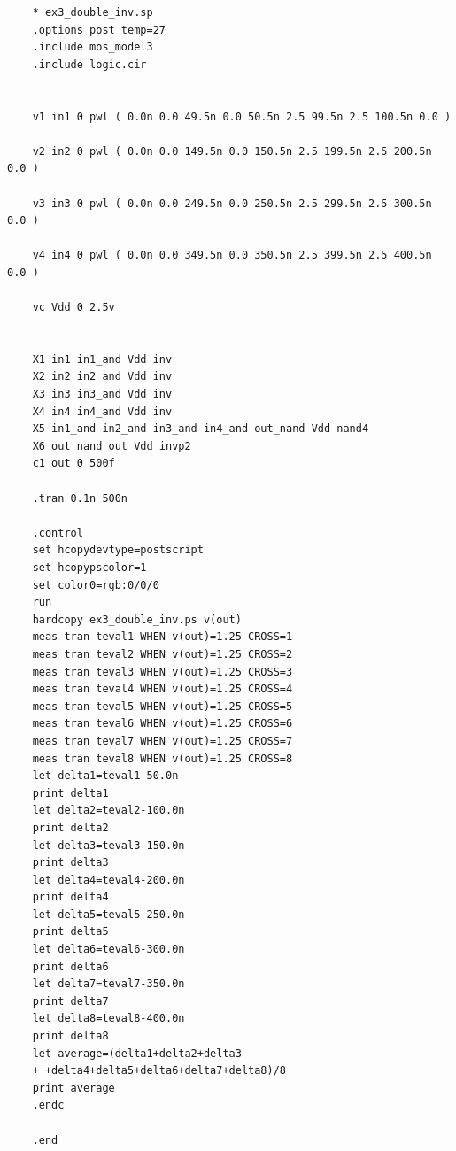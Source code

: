 \documentclass{jsarticle}
\begin{document}
\begin{lstlisting}
    * ex3_double_inv.sp
    .options post temp=27
    .include mos_model3
    .include logic.cir
    
    
    v1 in1 0 pwl ( 0.0n 0.0 49.5n 0.0 50.5n 2.5 99.5n 2.5 100.5n 0.0 )
    
    v2 in2 0 pwl ( 0.0n 0.0 149.5n 0.0 150.5n 2.5 199.5n 2.5 200.5n 0.0 )
    
    v3 in3 0 pwl ( 0.0n 0.0 249.5n 0.0 250.5n 2.5 299.5n 2.5 300.5n 0.0 )
    
    v4 in4 0 pwl ( 0.0n 0.0 349.5n 0.0 350.5n 2.5 399.5n 2.5 400.5n 0.0 )
    
    vc Vdd 0 2.5v
    
    
    X1 in1 in1_and Vdd inv
    X2 in2 in2_and Vdd inv
    X3 in3 in3_and Vdd inv
    X4 in4 in4_and Vdd inv
    X5 in1_and in2_and in3_and in4_and out_nand Vdd nand4
    X6 out_nand out Vdd invp2
    c1 out 0 500f
    
    .tran 0.1n 500n
    
    .control
    set hcopydevtype=postscript
    set hcopypscolor=1
    set color0=rgb:0/0/0
    run
    hardcopy ex3_double_inv.ps v(out)
    meas tran teval1 WHEN v(out)=1.25 CROSS=1
    meas tran teval2 WHEN v(out)=1.25 CROSS=2
    meas tran teval3 WHEN v(out)=1.25 CROSS=3
    meas tran teval4 WHEN v(out)=1.25 CROSS=4
    meas tran teval5 WHEN v(out)=1.25 CROSS=5
    meas tran teval6 WHEN v(out)=1.25 CROSS=6
    meas tran teval7 WHEN v(out)=1.25 CROSS=7
    meas tran teval8 WHEN v(out)=1.25 CROSS=8
    let delta1=teval1-50.0n
    print delta1
    let delta2=teval2-100.0n
    print delta2
    let delta3=teval3-150.0n
    print delta3
    let delta4=teval4-200.0n
    print delta4
    let delta5=teval5-250.0n
    print delta5
    let delta6=teval6-300.0n
    print delta6
    let delta7=teval7-350.0n
    print delta7
    let delta8=teval8-400.0n
    print delta8
    let average=(delta1+delta2+delta3
    + +delta4+delta5+delta6+delta7+delta8)/8
    print average
    .endc
    
    .end
    
\end{lstlisting}
\end{document}
